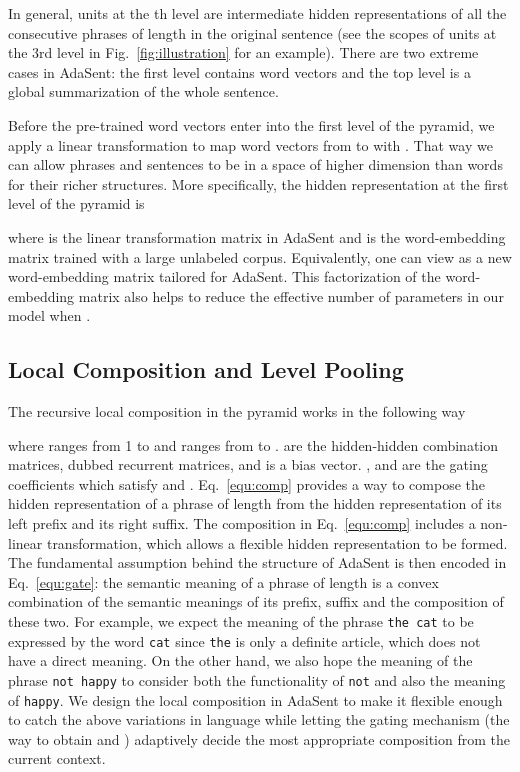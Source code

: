 \documentclass{article}
\theoremstyle{definition}
\begin{document}
In general, units at the th level are intermediate hidden representations of all the consecutive phrases of length  in the original sentence (see the scopes of units at the 3rd level in Fig.~\ref{fig:illustration} for an example). There are two extreme cases in AdaSent: the first level contains word vectors and the top level is a global summarization of the whole sentence.

Before the pre-trained word vectors enter into the first level of the pyramid, we apply a linear transformation to map word vectors from  to  with . That way we can allow phrases and sentences to be in a space of higher dimension than words for their richer structures.
More specifically, the hidden representation  at the first level of the pyramid is

where  is the linear transformation matrix in AdaSent and  is the word-embedding matrix trained with a large unlabeled corpus. Equivalently, one can view  as a new word-embedding matrix tailored for AdaSent. This factorization of the word-embedding matrix also helps to reduce the effective number of parameters in our model when .

\subsection{Local Composition and Level Pooling}
The recursive local composition in the pyramid works in the following way


where  ranges from 1 to  and  ranges from  to .  are the hidden-hidden combination matrices, dubbed recurrent matrices, and  is a bias vector. ,  and  are the gating coefficients which satisfy  and . Eq.~\ref{equ:comp} provides a way to compose the hidden representation of a phrase of length  from the hidden representation of its left  prefix and its right  suffix. The composition in Eq.~\ref{equ:comp} includes a non-linear transformation, which allows a flexible hidden representation to be formed. The fundamental assumption behind the structure of AdaSent is then encoded in Eq.~\ref{equ:gate}: the semantic meaning of a phrase of length  is a convex combination of the semantic meanings of its  prefix,  suffix and the composition of these two. For example, we expect the meaning of the phrase \texttt{the cat} to be expressed by the word \texttt{cat} since \texttt{the} is only a definite article, which does not have a direct meaning. On the other hand, we also hope the meaning of the phrase \texttt{not happy} to consider both the functionality of \texttt{not} and also the meaning of \texttt{happy}. We design the local composition in AdaSent to make it flexible enough to catch the above variations in language while letting the gating mechanism (the way to obtain  and ) adaptively decide the most appropriate composition from the current context.
\end{document}
